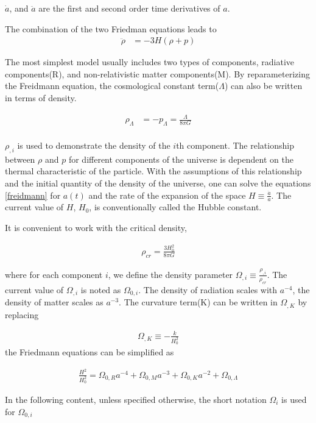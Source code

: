 $\dot{a}$, and $\ddot{a}$ are the first and second order time derivatives of $a$. 

The combination of the two Friedman equations leads to  
\begin{align}
\ddot{\rho}& = -3 H (\rho + p)
\end{align}

The most simplest model usually includes two types of components, radiative components(R), and non-relativistic matter components(M). By reparameterizing the Freidmann equation, the cosmological constant term($\Lambda$) can also be written in terms of density. 

\begin{align}
\rho_{\Lambda}& = -p_{\Lambda} = \frac{\Lambda}{8 \pi G}\\
\end{align}

$\rho_{,i}$ is used to demonstrate the density of the $i$th component. The relationship between $\rho$ and $p$ for different components of the universe is dependent on the thermal characteristic of the particle. With the assumptions of this relationship and the initial quantity of the density of the universe,  one can solve the equations \ref{freidmann} for $a(t)$ and the rate of the expansion of the space $H \equiv \frac{\dot{a}}{a}$. The current value of $H$, $H_0$, is conventionally called the Hubble constant. 

It is convenient to work with the critical density,

\begin{align}
\rho_{cr} = \frac{3 H_0^2}{8 \pi G}
\end{align}

where for each component $i$, we define the density parameter $\Omega_{,i} \equiv \frac{\rho_{,i}}{\rho_{cr}}$. The current value of $\Omega_{,i}$ is noted as $\Omega_{0,i}$. The density of radiation scales with $a^{-4}$, the density of matter scales as $a^{-3}$. The curvature term(K) can be written in $\Omega_{,K}$ by replacing 

\begin{align}
\Omega_{,K} \equiv -\frac{k}{H_0^2}
\end{align}
the Friedmann equations can be simplified as

\begin{align}
\frac{H^2}{H_0^2}  = \Omega_{0,R} a^{-4} + \Omega_{0, M} a^{-3}+ \Omega_{0,K} a^{-2} + \Omega_{0,\Lambda}
\end{align}

In the following content, unless specified otherwise, the short notation $\Omega_i$ is used for $\Omega_{0,i}$

